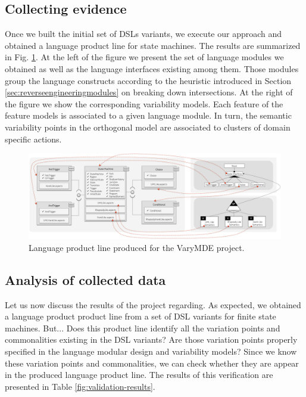 \subsection{Collecting evidence}

Once we built the initial set of DSLs variants, we execute our approach and obtained a language product line for state machines. The results are summarized in Fig. \ref{fig:results-casestudy}. At the left of the figure we present the set of language modules we obtained as well as the language interfaces existing among them. Those modules group the language constructs according to the heuristic introduced in Section \ref{sec:reverseengineeringmodules} on breaking down intersections. At the right of the figure we show the corresponding variability models. Each feature of the feature models is associated to a given language module. In turn, the semantic variability points in the orthogonal model are associated to clusters of domain specific actions.


\begin{figure}
	\centering
	\includegraphics[width=1\linewidth]{images/results-casestudy.png}
	\caption{Language product line produced for the VaryMDE project. }
	\label{fig:results-casestudy}
\end{figure}

\subsection{Analysis of collected data}

Let us now discuss the results of the project regarding. As expected, we obtained a language product product line from a set of DSL variants for finite state machines. But... Does this product line identify all the variation points and commonalities existing in the DSL variants? Are those variation points properly specified in the language modular design and variability models? Since we know these variation points and commonalities, we can check whether they are appear in the produced language product line. The results of this verification are presented in Table \ref{fig:validation-results}.

